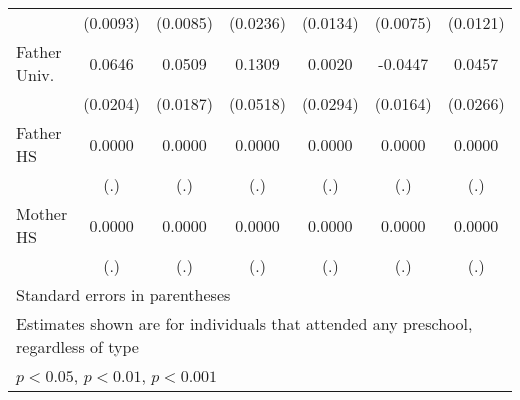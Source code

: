 \begin{table}[htbp]
\begin{tabular}{l*{6}{c}}
            &    (0.0093)         &    (0.0085)         &    (0.0236)         &    (0.0134)         &    (0.0075)         &    (0.0121)         \\
\addlinespace
Father Univ.&      0.0646\sym{**} &      0.0509\sym{**} &      0.1309\sym{*}  &      0.0020         &     -0.0447\sym{**} &      0.0457         \\
            &    (0.0204)         &    (0.0187)         &    (0.0518)         &    (0.0294)         &    (0.0164)         &    (0.0266)         \\
\addlinespace
Father HS   &      0.0000         &      0.0000         &      0.0000         &      0.0000         &      0.0000         &      0.0000         \\
            &         (.)         &         (.)         &         (.)         &         (.)         &         (.)         &         (.)         \\
\addlinespace
Mother HS   &      0.0000         &      0.0000         &      0.0000         &      0.0000         &      0.0000         &      0.0000         \\
            &         (.)         &         (.)         &         (.)         &         (.)         &         (.)         &         (.)         \\
\bottomrule
\multicolumn{7}{l}{\footnotesize Standard errors in parentheses}\\
\multicolumn{7}{l}{\footnotesize Estimates shown are for individuals that attended any preschool, regardless of type}\\
\multicolumn{7}{l}{\footnotesize \sym{*} \(p<0.05\), \sym{**} \(p<0.01\), \sym{***} \(p<0.001\)}\\
\end{tabular}
\end{table}

